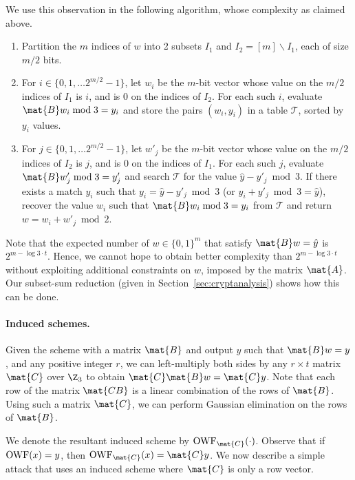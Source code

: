 We use this observation in the following algorithm, whose complexity as claimed above.
\begin{enumerate}
  \item Partition the $m$ indices of $w$ into 2 subsets $I_1$ and $I_2 = [m] \backslash I_1$, each of size $m/2$ bits.
  \item For $i \in \{0,1,\ldots 2^{m/2} - 1\}$, let $w_i$ be the $m$-bit vector whose value on the $m/2$ indices of $I_1$ is $i$, and is 0 on the indices of $I_2$. For each such $i$,
      evaluate $\mat{B} w_i \bmod 3 = y_i$ and store the pairs $(w_i,y_i)$ in a table $\mathcal{T}$, sorted by $y_i$ values.
  \item For $j \in \{0,1,\ldots 2^{m/2} - 1\}$, let $w'_j$ be the $m$-bit vector whose value on the $m/2$ indices of $I_2$ is $j$, and is 0 on the indices of $I_1$. For each such $j$,
      evaluate $\mat{B} w'_j \bmod 3 = y'_j$ and search $\mathcal{T}$ for the value $\hat{y} - y'_j \bmod 3$. If there exists a match $y_i$ such that $y_i = \hat{y} - y'_j \bmod 3$ (or $y_i + y'_j \bmod 3 = \hat{y}$), recover the value $w_i$ such that $\mat{B} w_i \bmod 3 = y_i$ from $\mathcal{T}$
      and return $w = w_i + w'_j \bmod 2$.
\end{enumerate}

Note that the expected number of $w \in \{0,1\}^m$ that satisfy $\mat{B} w = \hat{y}$ is $2^{m - \log 3 \cdot t}$. Hence, we cannot hope to obtain better complexity than $2^{m - \log 3 \cdot t}$ without exploiting additional constraints on $w$, imposed by the matrix $\mat{A}$. Our
subset-sum reduction (given in Section~\ref{sec:cryptanalysis}) shows how this can be done.

\paragraph{Induced schemes.}
Given the scheme \ttOWF with a matrix $\mat{B}$ and output $y$ such that $\mat{B}w = y$, and any positive integer $r$, we can left-multiply both sides by any $r \times t$ matrix $\mat{C}$ over $\Z_3$ to obtain $\mat{C}\mat{B}w = \mat{C}y$. Note that each row of the matrix $\mat{CB}$ is a linear combination of the rows of $\mat{B}$. Using such a matrix $\mat{C}$, we can perform Gaussian elimination on the rows of $\mat{B}$.

We denote the resultant induced scheme by $\textnormal{OWF}_\mat{C}(\cdot)$. Observe that if $\textnormal{OWF}(x) = y$, then $\textnormal{OWF}_\mat{C}(x) = \mat{C}y$.
We now describe a simple attack that uses an induced scheme where $\mat{C}$ is only a row vector.

